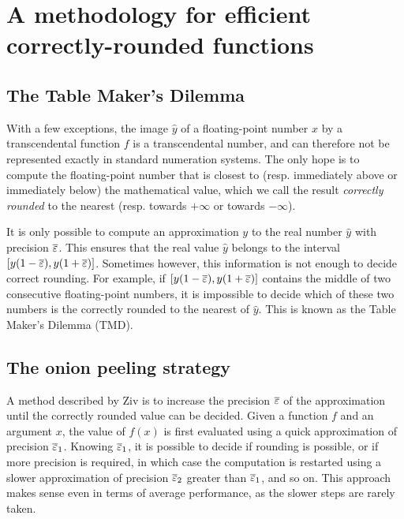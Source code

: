 \section{A methodology for efficient correctly-rounded functions}
\label{section:methodology}


\subsection{The Table Maker's Dilemma}

With a few exceptions, the image $\hat{y}$ of a floating-point number $x$ by
a transcendental function $f$ is a transcendental number, and can
therefore not be represented exactly in standard numeration systems.
The only hope is to compute the floating-point number that is closest
to (resp.  immediately above or immediately below) the mathematical
value, which we call the result \emph{correctly rounded} to the
nearest (resp.  towards $+\infty$ or towards $-\infty$).

It is only possible to compute an approximation ${y}$ to the real
number $\hat{y}$ with precision ${\overline{\varepsilon}}{}$. This ensures that the real value
$\hat{y}$ belongs to the interval $[{y}(1-{\overline{\varepsilon}}{}) , {y}(1+{\overline{\varepsilon}}{})]$.
Sometimes however, this information is not enough to decide correct
rounding. For example, if $[{y}(1-{\overline{\varepsilon}}{}) , {y}(1+{\overline{\varepsilon}}{})]$
contains the middle of two consecutive floating-point numbers, it is
impossible to decide which of these two numbers is the correctly
rounded to the nearest of $\hat{y}$. This is known as the Table Maker's
Dilemma (TMD).

\subsection{The onion peeling strategy}

A method described by Ziv \cite{Ziv91} is to increase the precision
${\overline{\varepsilon}}$ of the approximation until the correctly rounded value can
be decided.  Given a function $f$ and an argument $x$, the value of
$f(x)$ is first evaluated using a quick approximation of precision
${\overline{\varepsilon}}_1$.  Knowing ${\overline{\varepsilon}}_1$, it is possible to decide if
rounding is possible, or if more precision is required, in which case
the computation is restarted using a slower approximation of precision
${\overline{\varepsilon}}_2$ greater than ${\overline{\varepsilon}}_1$, and so on. This approach makes
sense even in terms of average performance, as the slower steps are
rarely taken.


